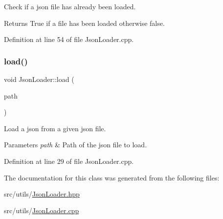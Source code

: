 Check if a json file has already been loaded. 

\begin{DoxyReturn}{Returns}
True if a file has been loaded otherwise false. 
\end{DoxyReturn}


Definition at line 54 of file Json\+Loader.\+cpp.

\mbox{\label{classtls_1_1_json_loader_ad587735dbb8e8cfc5cd002a0aa9a7d7f}} 
\subsubsection{\texorpdfstring{load()}{load()}}
{\footnotesize\ttfamily void Json\+Loader\+::load (\begin{DoxyParamCaption}\item[{const std\+::filesystem\+::path \&}]{path }\end{DoxyParamCaption})}



Load a json from a given json file. 


\begin{DoxyParams}{Parameters}
{\em path} & Path of the json file to load. \\
\hline
\end{DoxyParams}


Definition at line 29 of file Json\+Loader.\+cpp.



The documentation for this class was generated from the following files\+:\begin{DoxyCompactItemize}
\item 
src/utils/\hyperlink{_json_loader_8hpp}{Json\+Loader.\+hpp}\item 
src/utils/\hyperlink{_json_loader_8cpp}{Json\+Loader.\+cpp}\end{DoxyCompactItemize}
